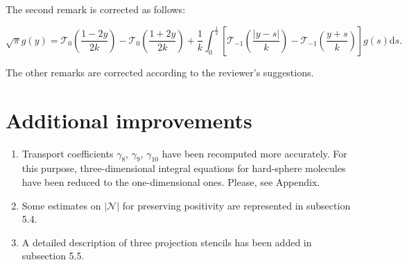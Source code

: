 \documentclass{article}
\newcommand{\dd}{\mathrm{d}}
\newcommand{\Nu}{\mathcal{N}}
\begin{document}
The second remark is corrected as follows:
\begin{leftbar}
\begin{equation}\label{eq:bkw_g_equation}
    \sqrt{\pi} g(y) = \mathcal{T}_0 \left(\frac{1-2y}{2k}\right) - \mathcal{T}_0 \left(\frac{1+2y}{2k}\right)
        + \frac1k \int_0^{\frac12} \left[ \mathcal{T}_{-1}\left(\frac{|y-s|}{k}\right)
        - \mathcal{T}_{-1}\left(\frac{y+s}{k}\right) \right] g(s) \dd{s}.
\end{equation}
\end{leftbar}

The other remarks are corrected according to the reviewer's suggestions.

\section{Additional improvements}

\begin{enumerate}
    \item Transport coefficients \(\gamma_8\), \(\gamma_9\), \(\gamma_{10}\) have been recomputed more accurately.
    For this purpose, three-dimensional integral equations for hard-sphere molecules
    have been reduced to the one-dimensional ones. Please, see Appendix.
    \item Some estimates on \(|\Nu|\) for preserving positivity are represented in subsection 5.4.
    \item A detailed description of three projection stencils has been added in subsection 5.5.
\end{enumerate}



\end{document}
